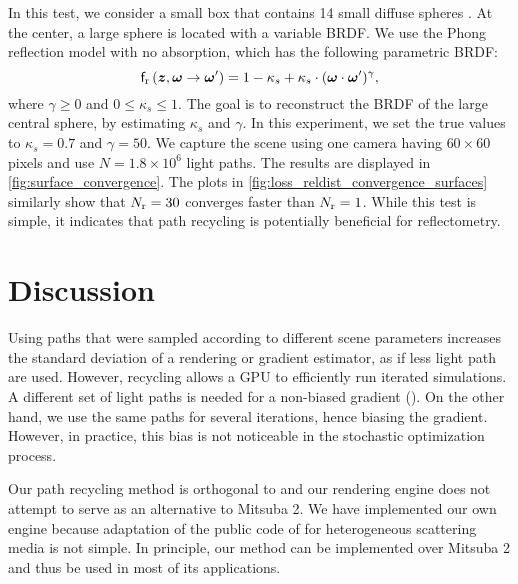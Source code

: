 \documentclass{article}
\begin{document}
In this test, we consider a small box that contains 14 small diffuse spheres \citep{Smallpaint}. At the center, a large sphere is located with a variable \ac{BRDF}. We use the Phong reflection model \citep{phong1975illumination} with no absorption, which has the following parametric \ac{BRDF}:
\begin{equation}
\label{eq:phong}
\mathsf{f}_{\text{r}}\left({\boldsymbol{z}, \boldsymbol{\omega}\rightarrow\boldsymbol{\omega}'}\right) = 1-\kappa_s + \kappa_s \cdot (\boldsymbol{\omega}\cdot\boldsymbol{\omega}')^\gamma,
\end{equation}
where $\gamma\geq0$ and $0\leq \kappa_s \leq 1$. The goal is to reconstruct the \ac{BRDF} of the large central sphere, by estimating $\kappa_s$ and $\gamma$. In this experiment, we set the true values to $\kappa_s=0.7$ and $\gamma=50$. We capture the scene using one camera having $60\times60$ pixels and use $N=1.8\times10^6$ light paths. The results are displayed in \fig\ref{fig:surface_convergence}. The plots in \fig\ref{fig:loss_reldist_convergence_surfaces} similarly show that $N_{\text{r}}=30$ converges faster than $N_{\text{r}}=1$. While this test is simple, it indicates that path recycling is potentially beneficial for reflectometry. 


\section{Discussion}
\label{sec:conclusion}
Using paths that were sampled according to different scene parameters increases the standard deviation of a rendering or gradient estimator, as if less light path are used. However, recycling allows a \ac{GPU} to efficiently run iterated simulations. A different set of light paths is needed for a non-biased gradient (\eqsnopar{\ref{eq:gradient_simualtion}, \ref{eq:forward_simualtion}}). On the other hand, we use the same paths for several iterations, hence biasing the gradient. However, in practice, this bias is not noticeable in the stochastic optimization process. 

Our path recycling method is orthogonal to \citep{nimier2019mitsuba, nimier2020radiative} and our rendering engine does not attempt to serve as an alternative to Mitsuba 2. We have implemented our own engine because adaptation of the public code of \citep{nimier2020radiative} for heterogeneous scattering media is not simple. In principle, our method can be implemented over Mitsuba 2 and thus be used in most of its applications.
\end{document}
